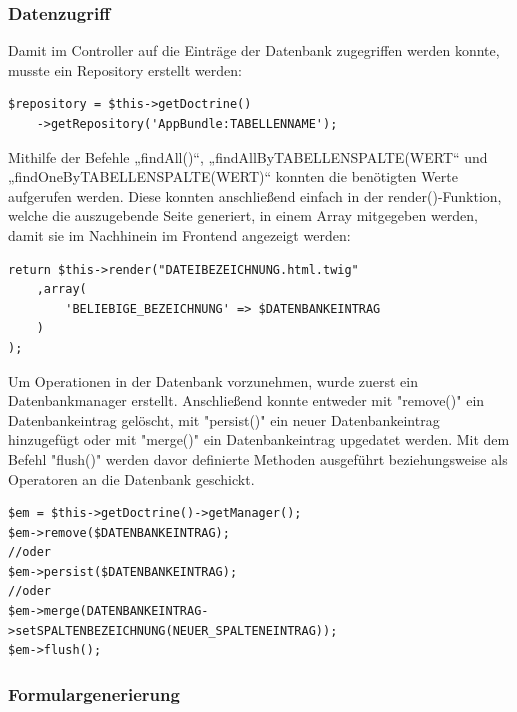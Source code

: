     \subsubsection{Datenzugriff}

Damit im Controller auf die Einträge der Datenbank zugegriffen werden konnte, musste ein Repository erstellt werden:
	\lstset{language=php}
  	\begin{lstlisting}
$repository = $this->getDoctrine()
    ->getRepository('AppBundle:TABELLENNAME');
  	\end{lstlisting}
Mithilfe der Befehle „findAll()“, „findAllByTABELLENSPALTE(WERT“ und „findOneByTABELLENSPALTE(WERT)“ konnten die benötigten Werte aufgerufen werden.
Diese konnten anschließend einfach in der render()-Funktion, welche die auszugebende Seite generiert, in einem Array mitgegeben werden, damit sie im Nachhinein im Frontend angezeigt werden:
	\lstset{language=php}
  	\begin{lstlisting}
return $this->render("DATEIBEZEICHNUNG.html.twig"
    ,array(
    	'BELIEBIGE_BEZEICHNUNG' => $DATENBANKEINTRAG
    )
);
  	\end{lstlisting}
Um Operationen in der Datenbank vorzunehmen, wurde zuerst ein Datenbankmanager erstellt. Anschließend konnte entweder mit "remove()" ein Datenbankeintrag gelöscht, mit "persist()" ein neuer Datenbankeintrag hinzugefügt oder mit "merge()" ein Datenbankeintrag upgedatet werden. Mit dem Befehl "flush()" werden davor definierte Methoden ausgeführt beziehungsweise als Operatoren an die Datenbank geschickt.
	
	\lstset{language=php}
  	\begin{lstlisting}
$em = $this->getDoctrine()->getManager();
$em->remove($DATENBANKEINTRAG);
//oder
$em->persist($DATENBANKEINTRAG);
//oder
$em->merge(DATENBANKEINTRAG->setSPALTENBEZEICHNUNG(NEUER_SPALTENEINTRAG));
$em->flush();
  	\end{lstlisting}
	

    \subsubsection{Formulargenerierung}

